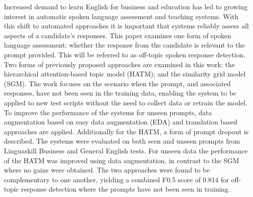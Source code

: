 Increased demand to learn English for business and education has led to growing interest in automatic spoken language assessment and teaching systems. With this shift to automated approaches it is important that systems reliably assess all aspects of a candidate's responses. This paper examines one form of spoken language assessment; whether the response from the candidate is relevant to the prompt provided. This will be referred to as off-topic spoken response detection. Two forms of previously proposed approaches are examined in this work: the hierarchical attention-based topic model (HATM); and the similarity grid model (SGM). The work focuses on the scenario when the prompt, and associated responses, have not been seen in the training data, enabling the system to be applied to new test scripts without the need to collect data or retrain the model. To improve the performance of the systems for unseen prompts, data augmentation based on easy data augmentation (EDA) and translation based approaches are applied. Additionally for the HATM, a form of prompt dropout is described. The systems were evaluated on both seen and unseen prompts from Linguaskill Business and General English tests. For unseen data the performance of the HATM was improved using data augmentation, in contrast to the SGM where no gains were obtained. The two approaches were found to be complementary to one another, yielding a combined F0.5 score of 0.814 for off-topic response detection where the prompts have not been seen in training.

